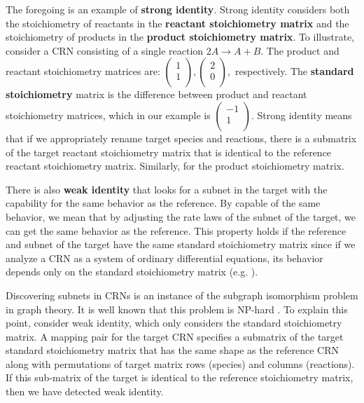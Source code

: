 \documentclass[webpdf,contemporary,large]{oup-authoring-template}
\theoremstyle{thmstyleone}%
\theoremstyle{thmstyletwo}%
\theoremstyle{thmstylethree}%
\begin{document}
The foregoing is an example of {\bf strong identity}.
Strong identity considers both the stoichiometry of
reactants in the {\bf reactant stoichiometry matrix} and the stoichiometry of
products in the {\bf product stoichiometry matrix}.
To illustrate, consider
a CRN consisting of a single reaction $2A \rightarrow A + B$.
The product and reactant stoichiometry matrices are:
$
\begin{pmatrix}
1 \\
1 \\
\end{pmatrix},
\begin{pmatrix}
2 \\
0 \\
\end{pmatrix},
$
respectively.
The {\bf standard stoichiometry} matrix is the difference between product and reactant stoichiometry matrices,
which in our example is
$
\begin{pmatrix}
-1 \\
1 \\
\end{pmatrix}
$.
Strong identity means that if we appropriately rename target species and reactions, there is a submatrix of the target reactant stoichiometry matrix that is identical to the reference reactant stoichiometry matrix. Similarly, for the product stoichiometry matrix.

There is also {\bf weak identity} that looks for a subnet in the target with the capability for the same behavior as the reference.
By capable of the same behavior, we mean that by adjusting the rate laws of the subnet of the target, we can get the same behavior as the reference.
This property holds if the reference and subnet of the target have the same standard stoichiometry matrix
since
if we analyze a CRN as a system of ordinary differential equations, its behavior depends only on the standard stoichiometry matrix (e.g. \citep{sauro_systems_2014}).

Discovering subnets in CRNs is an instance of the subgraph isomorphism problem in graph theory. It is well known that this problem is NP-hard \citep{doi:10.1137/1024022}.
To explain this point, consider weak identity, which only considers the standard stoichiometry matrix.
A mapping pair for the target CRN specifies a submatrix of the target standard stoichiometry matrix that has the same shape as the reference CRN along with permutations of target matrix rows (species) and columns (reactions).
If this sub-matrix of the target is identical to the reference stoichiometry matrix, then we have detected weak identity.
\end{document}
